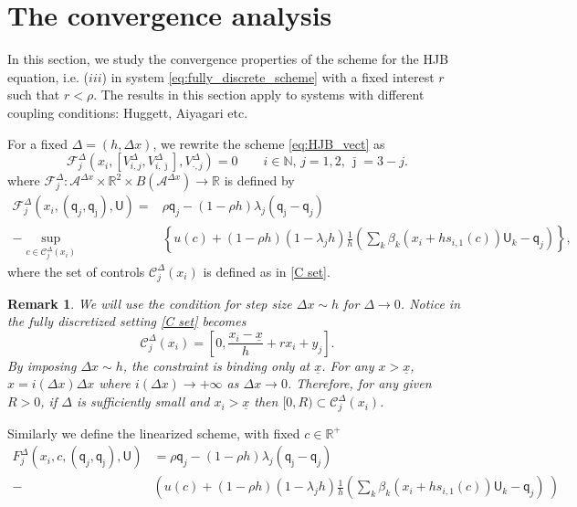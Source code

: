 \documentclass[11pt]{article}
\numberwithin{equation}{section}
\newtheorem{remark}[theorem]{Remark}
\theoremstyle{Claim}
\newcommand{\NN}{{\mathbb{N}}}
\newcommand{\R}{\mathbb{R}}
\newcommand{\mA}{\mathcal A}
\newcommand{\mC}{\mathcal C}
\def\bq{{\mathsf{q}}}
\def\sU{{\mathsf{U}}}
\newcommand{\ux}{{\underline x}}
\newcommand{\beq}{\begin{equation}}
\newcommand{\eeq}{\end{equation}}
\theoremstyle{plain}
\newcommand{\D}{\Delta}
\newcommand{\Dx}{{\Delta x}}
\begin{document}
\section{The convergence analysis}
In this section, we study the convergence properties of the scheme for the HJB equation, i.e. ($iii$) in system \eqref{eq:fully_discrete_scheme} with a fixed interest $r$ such that $r<\rho$. The results in this section apply to systems with different coupling conditions: Huggett, Aiyagari etc. \par

For a fixed $\Delta=(h,\Dx)$, we rewrite the scheme \eqref{eq:HJB_vect} as
\begin{equation}\label{Scheme}
	\mathcal{F}^\D_j\left(x_i,\left[V^{\Delta}_{i,j},V^{\Delta}_{i,\bar \jmath}\right],V^{\Delta}_{\cdot,j}\right)=0\qquad i\in\NN,\,j=1,2,\,\bar{\jmath}=3-j.
\end{equation}
where $\mathcal{F}^\D_j:\mA^\Dx\times\R^2\times B(\mA^\Dx)\to \R$ is defined by 
\begin{equation}\label{def S}
\begin{aligned}
\mathcal{F}^\D_j(x_i,(\bq_j,\bq_{\bar \jmath}),\sU)={}&\rho \bq_j-(1-\rho h)\lambda_j(\bq_{\bar \jmath}-\bq_j)\\
-\sup_{c\in \mC^{\D}_{j}(x_i)}&\left\{
 u(c)+(1-\rho h)(1-\lambda_jh)\frac{1}{h}\left(\sum_k \beta_k(x_i+hs_{i,1}(c))\sU_k-\bq_j  \right)\right\},
\end{aligned}
\end{equation}
where the set of controls $ \mC^{\D}_{j}(x_i)$ is defined as in \cref{C set}.
\begin{remark}\label{C_j}
We will use the condition for step size $\Dx\sim h$ for $\D\to 0$. Notice in the fully discretized setting \cref{C set} becomes  
\beq\label{Eq:C_j}
\mC^{\D}_{j}(x_i)=\left[0, \frac{x_i-\ux}{h}+rx_i+y_j\right].
\eeq
By imposing $\Dx\sim h$, the constraint is binding only at $\ux$. For any $x>\ux$, $x=i(\D x)\Dx$ where $i(\D x)\to +\infty$ as $\D x\to 0$. Therefore, for any given $R>0$, if $\D$ is sufficiently small and $x_i>\ux$ then $[0,R)\subset \mC^{\D}_{j}(x_i)$. 
\end{remark}
Similarly we define the linearized scheme, with fixed $c\in \mathbb{R}^+$
\begin{equation}\label{def linear S}
\begin{aligned}
F^\D_j(x_i,c,(\bq_j,\bq_{\bar \jmath}),\sU)&=\rho \bq_j-(1-\rho h)\lambda_j(\bq_{\bar \jmath}-\bq_j)\\
-&\left(
 u(c)+(1-\rho h)(1-\lambda_jh)\frac{1}{h}\left(\sum_k \beta_k(x_i+hs_{i,1}(c))\sU_k-\bq_j  \right)\
\right)
\end{aligned}
\end{equation}
\end{document}
